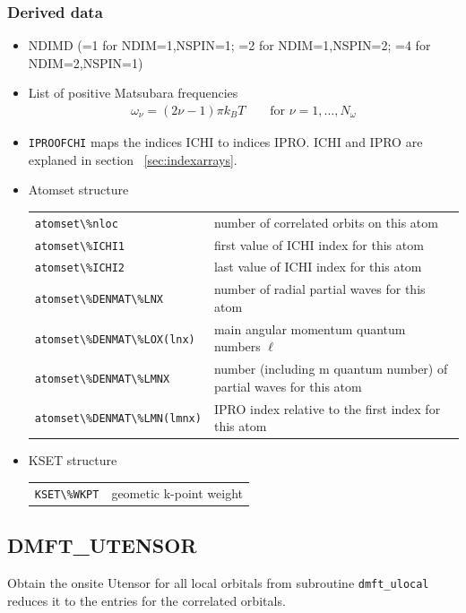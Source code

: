 \documentclass[11pt,a4paper]{report}
\begin{document}
\subsubsection{Derived data}
\begin{itemize}
\item NDIMD (=1 for NDIM=1,NSPIN=1; =2 for NDIM=1,NSPIN=2; =4 for
  NDIM=2,NSPIN=1)
\item List of positive Matsubara frequencies
\begin{eqnarray}
\omega_\nu=(2\nu-1)\pi k_BT \qquad\text{for $\nu=1,\ldots,N_\omega$}
\end{eqnarray}
\item \verb|IPROOFCHI| maps the indices ICHI to indices IPRO. ICHI and
  IPRO are explaned in section ~\ref{sec:indexarrays}.
\item Atomset structure
\begin{center}
 \begin{tabular}{ll}
 \verb|atomset\%nloc| & number of correlated orbits on this atom \\
\verb|atomset\%ICHI1| & first value of ICHI index for this atom\\
\verb|atomset\%ICHI2| & last value of ICHI index for this atom\\
\verb|atomset\%DENMAT\%LNX| & number of radial partial waves  for this atom\\
\verb|atomset\%DENMAT\%LOX(lnx)| 
     & main angular momentum quantum numbers $\ell$\\
\verb|atomset\%DENMAT\%LMNX| 
     & number (including m quantum number) of partial waves  for this atom\\
\verb|atomset\%DENMAT\%LMN(lmnx)| 
     & IPRO index relative to the first index for this atom\\
\end{tabular}
\end{center}
%
\item KSET structure
\begin{center}
 \begin{tabular}{ll}
 \verb|KSET\%WKPT| & geometic k-point weight\\
\end{tabular}
\end{center}
\end{itemize}

\subsection{DMFT\_UTENSOR}
Obtain the onsite Utensor for all local orbitals from subroutine
\verb|dmft_ulocal| reduces it to the entries for the correlated
orbitals.
\end{document}
